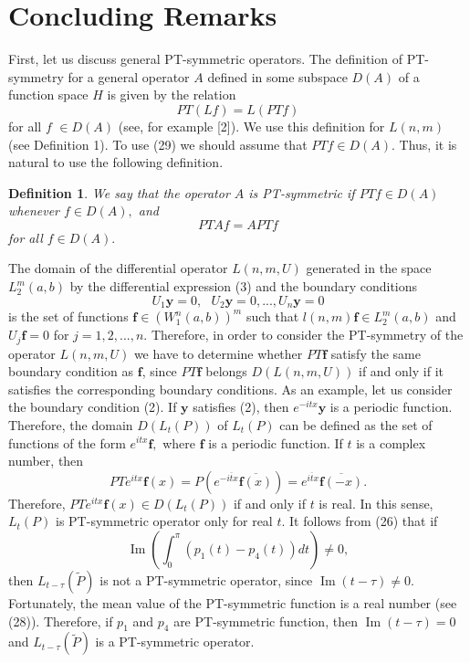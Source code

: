 \documentclass{article}%
\newtheorem{definition}{Definition}
\begin{document}
\section{Concluding Remarks}

First, let us discuss general PT-symmetric operators. The definition of
PT-symmetry for a general operator $A$ defined in some subspace $D(A)$ of a
function space $H$ is given by the relation
\begin{equation}
PT(Lf)=L(PTf) \tag{29}%
\end{equation}
for all $f$ $\in D(A)$ (see, for example [2]). We use this definition for
$L(n,m)$ (see Definition 1). To use (29) we should assume that $PTf\in D(A).$
Thus, it is natural to use the following definition.

\begin{definition}
We say that the operator $A$ is PT-symmetric if $PTf\in D(A)$ whenever $f\in
D(A),$ and
\begin{equation}
PTAf=APTf \tag{30}%
\end{equation}
for all $f\in D(A).$
\end{definition}

The domain of the differential operator $L(n,m,U)$ generated in the space
$L_{2}^{m}(a,b)$ by the differential expression (3) and the boundary
conditions
\begin{equation}
U_{1}\mathbf{y}=0,\text{ }U_{2}\mathbf{y}=0,...,U_{n}\mathbf{y}=0 \tag{31}%
\end{equation}
is the set of functions $\mathbf{f\in}\left(  W_{1}^{n}(a,b)\right)  ^{m}$
such that $l(n,m)\mathbf{f\in}L_{2}^{m}(a,b)$ and $U_{j}\mathbf{f}=0$ for
$j=1,2,...,n$. Therefore, in order to consider the PT-symmetry of the operator
$L(n,m,U)$ we have to determine whether $PT\mathbf{f}$ satisfy the same
boundary condition as $\mathbf{f}$, since $PT\mathbf{f}$ belongs $D(L(n,m,U))$
if and only if it satisfies the corresponding boundary conditions. As an
example, let us consider the boundary condition (2). If $\mathbf{y}$ satisfies
(2), then $e^{-itx}\mathbf{y}$ is a periodic function. Therefore, the domain
$D(L_{t}(P))$ of $L_{t}(P)$ can be defined as the set of functions of the form
$e^{itx}\mathbf{f,}$ where $\mathbf{f}$ is a periodic function. If $t$ is a
complex number, then
\[
PTe^{itx}\mathbf{f}(x)=P(e^{-i\overline{t}x}\overline{\mathbf{f}%
(x)})=e^{i\overline{t}x}\overline{\mathbf{f}(-x)}.
\]
Therefore, $PTe^{itx}\mathbf{f}(x)\in D(L_{t}(P))$ if and only if $t$ is real.
In this sense, $L_{t}(P)$ is PT-symmetric operator only for real $t$. It
follows from (26) that if
\begin{equation}
\operatorname{Im}\left(  \int_{0}^{\pi}\left(  p_{1}(t)-p_{4}(t)\right)
dt\right)  \neq0, \tag{32}%
\end{equation}
then $L_{t-\tau}\left(  \widetilde{P}\right)  $ is not a PT-symmetric
operator, since $\operatorname{Im}(t-\tau)\neq0$. Fortunately, the mean value
of the PT-symmetric function is a real number (see (28)). Therefore, if
$p_{1}$ and $p_{4}$ are PT-symmetric function, then $\operatorname{Im}%
(t-\tau)=0$ and $L_{t-\tau}\left(  \widetilde{P}\right)  $ is a PT-symmetric operator.
\end{document}

